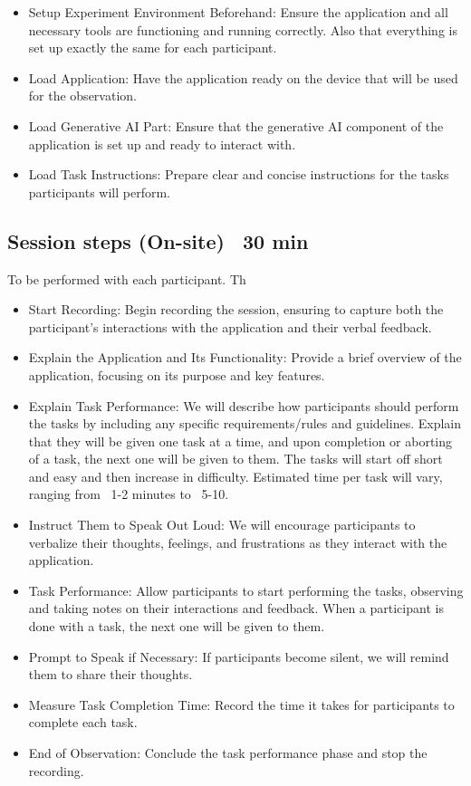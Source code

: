 \begin{itemize}
    \item Setup Experiment Environment Beforehand: Ensure the application and all necessary tools are functioning and running correctly. Also that everything is set up exactly the same for each participant.
    \item Load Application: Have the application ready on the device that will be used for the observation.
    \item Load Generative AI Part: Ensure that the generative AI component of the application is set up and ready to interact with.
    \item Load Task Instructions: Prepare clear and concise instructions for the tasks participants will perform.
\end{itemize}

\subsection{Session steps (On-site) ~30 min}
To be performed with each participant. Th
\begin{itemize}
    \item Start Recording: Begin recording the session, ensuring to capture both the participant's interactions with the application and their verbal feedback.
    \item Explain the Application and Its Functionality: Provide a brief overview of the application, focusing on its purpose and key features.
    \item Explain Task Performance: We will describe how participants should perform the tasks by including any specific requirements/rules and guidelines. Explain that they will be given one task at a time, and upon completion or aborting of a task, the next one will be given to them. The tasks will start off short and easy and then increase in difficulty. Estimated time per task will vary, ranging from ~1-2 minutes to ~5-10.
    \item Instruct Them to Speak Out Loud: We will encourage participants to verbalize their thoughts, feelings, and frustrations as they interact with the application.
    \item Task Performance: Allow participants to start performing the tasks, observing and taking notes on their interactions and feedback. When a participant is done with a task, the next one will be given to them.
    \item Prompt to Speak if Necessary: If participants become silent, we will remind them to share their thoughts.
    \item Measure Task Completion Time: Record the time it takes for participants to complete each task.
    \item End of Observation: Conclude the task performance phase and stop the recording.
\end{itemize}

